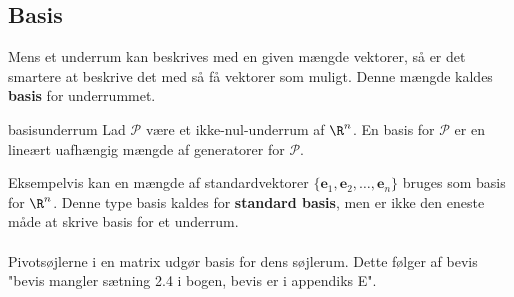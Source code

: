 \subsection{Basis}
Mens et underrum kan beskrives med en given mængde vektorer, så er det smartere at beskrive det med så få vektorer som muligt. Denne mængde kaldes \textbf{basis} for underrummet.
\begin{defn}{}{basisunderrum}
Lad $\mathcal{P}$ være et ikke-nul-underrum af $\R^n$. En basis for $\mathcal{P}$ er en lineært uafhængig mængde af generatorer for $\mathcal{P}$.
\end{defn}
\noindent
Eksempelvis kan en mængde af standardvektorer $\{\textbf{e}_1,\textbf{e}_2,\ldots,\textbf{e}_n\}$ bruges som basis for $\R^n$.
Denne type basis kaldes for \textbf{standard basis}, men er ikke den eneste måde at skrive basis for et underrum.\\\\
Pivotsøjlerne i en matrix udgør basis for dens søjlerum. Dette følger af bevis "bevis mangler sætning 2.4 i bogen, bevis er i appendiks E".
\\\\





